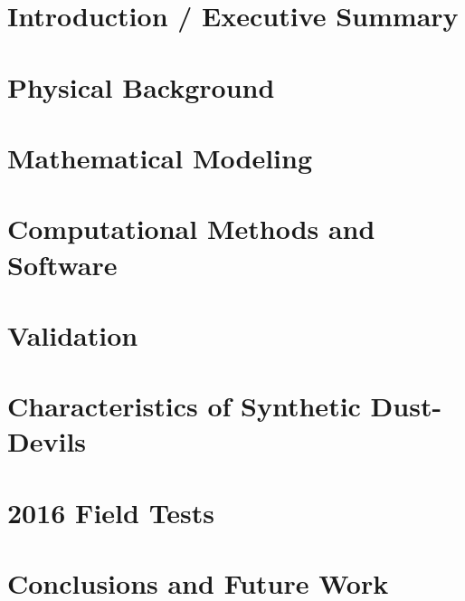 \documentclass[draft,utopia,12pt]{report}    %
\theoremstyle{definition}
\theoremstyle{remark}
\begin{document}
%
%
\chapter{Introduction / Executive Summary}


\chapter{Physical Background}


\chapter{Mathematical Modeling}


\chapter{Computational Methods and Software}


\chapter{Validation}


\chapter{Characteristics of Synthetic Dust-Devils}


\chapter{2016 Field Tests}


\chapter{Conclusions and Future Work}

\end{document}
